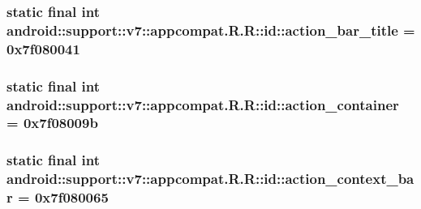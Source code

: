 \hypertarget{classandroid_1_1support_1_1v7_1_1appcompat_1_1_r_1_1id_98ca1e30d2b7cb037512fc165bf06872}{
\subsubsection[{action\_\-bar\_\-title}]{\setlength{\rightskip}{0pt plus 5cm}static final int android::support::v7::appcompat.R.R::id::action\_\-bar\_\-title = 0x7f080041}}
\label{classandroid_1_1support_1_1v7_1_1appcompat_1_1_r_1_1id_98ca1e30d2b7cb037512fc165bf06872}


\hypertarget{classandroid_1_1support_1_1v7_1_1appcompat_1_1_r_1_1id_a91224c5435ed0b6534595b5b05e398a}{
\subsubsection[{action\_\-container}]{\setlength{\rightskip}{0pt plus 5cm}static final int android::support::v7::appcompat.R.R::id::action\_\-container = 0x7f08009b}}
\label{classandroid_1_1support_1_1v7_1_1appcompat_1_1_r_1_1id_a91224c5435ed0b6534595b5b05e398a}


\hypertarget{classandroid_1_1support_1_1v7_1_1appcompat_1_1_r_1_1id_a2925664e0b5c3dc78b783c40a4568bc}{
\subsubsection[{action\_\-context\_\-bar}]{\setlength{\rightskip}{0pt plus 5cm}static final int android::support::v7::appcompat.R.R::id::action\_\-context\_\-bar = 0x7f080065}}
\label{classandroid_1_1support_1_1v7_1_1appcompat_1_1_r_1_1id_a2925664e0b5c3dc78b783c40a4568bc}


